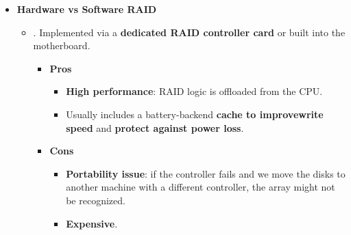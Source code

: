 \begin{itemize}
    \item \textbf{Hardware vs Software RAID}
    \begin{itemize}
        \item {}. Implemented via a \textbf{dedicated RAID controller card} or built into the motherboard.
        \begin{itemize}
            \item[\textcolor{Green3}{\faIcon{check-circle}}] \textcolor{Green3}{\textbf{Pros}}
            \begin{itemize}[label=\textcolor{Green3}{}]
                \item \textbf{High performance}: RAID logic is offloaded from the CPU.
                \item Usually includes a battery-backend \textbf{cache to improve\break write speed} and \textbf{protect against power loss}.
            \end{itemize}
            \item[\textcolor{Red2}{\faIcon{times-circle}}] \textcolor{Red2}{\textbf{Cons}}
            \begin{itemize}[label=\textcolor{Red2}{}]
                \item \textbf{Portability issue}: if the controller fails and we move the disks to another machine with a different controller, the array might not be recognized.
                \item \textbf{Expensive}.
            \end{itemize}
        \end{itemize}
        

\end{itemize}
\end{itemize}
